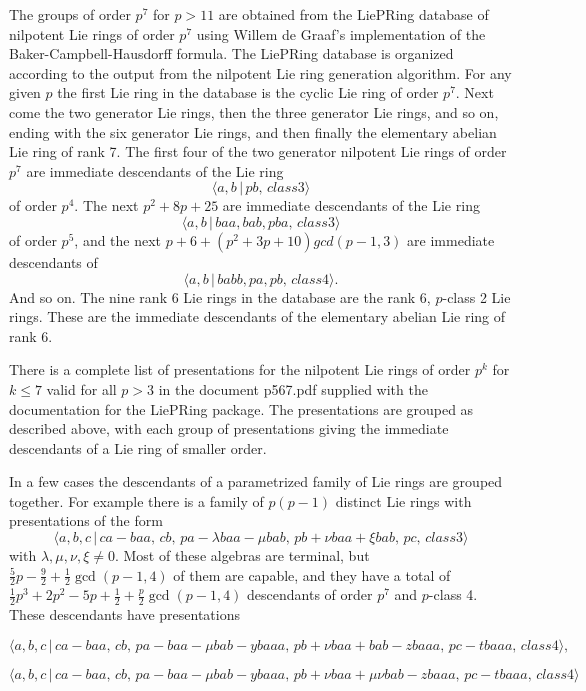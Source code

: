 The groups of order $p^{7}$ for $p>11$ are obtained from the LiePRing
database of nilpotent Lie rings of order $p^{7}$ using Willem de Graaf's
implementation of the Baker-Campbell-Hausdorff formula. The LiePRing
database is organized according to the output from the nilpotent Lie ring
generation algorithm. For any given $p$ the first Lie ring in the database
is the cyclic Lie ring of order $p^{7}$. Next come the two generator Lie
rings, then the three generator Lie rings, and so on, ending with the six
generator Lie rings, and then finally the elementary abelian Lie ring of
rank 7. The first four of the two generator nilpotent Lie rings of order 
$p^{7}$ are immediate descendants of the Lie ring
$$
\langle a,b\,|\,pb,\,class 3\rangle 
$$
of order $p^{4}$. The next $p^{2}+8p+25$ are immediate descendants of the
Lie ring
$$
\langle a,b\,|\,baa,bab,pba,\,class 3\rangle 
$$
of order $p^{5}$, and the next $p+6+(p^{2}+3p+10) gcd(p-1,3)$ are immediate
descendants of
$$
\langle a,b\,|\,babb,pa,pb,\,class 4\rangle . 
$$
And so on. The nine rank 6 Lie rings in the database are the rank 6, 
$p$-class 2 Lie rings. These are the immediate descendants of the elementary
abelian Lie ring of rank 6.

There is a complete list of presentations for the nilpotent Lie rings of
order $p^{k}$ for $k\leq 7$ valid for all $p>3$ in the document p567.pdf
supplied with the documentation for the LiePRing package. The presentations
are grouped as described above, with each group of presentations giving the
immediate descendants of a Lie ring of smaller order.

In a few cases the descendants of a parametrized family of Lie rings are
grouped together. For example there is a family of $p(p-1)$ distinct Lie
rings with presentations of the form
$$
\langle a,b,c\,|\,ca-baa,\,cb,\,pa-\lambda baa-\mu bab,\,pb+\nu baa+\xi
bab,\,pc,\,class 3\rangle 
$$
with $\lambda ,\mu ,\nu ,\xi \neq 0$. Most of these algebras are terminal,
but $\frac{5}{2}p-\frac{9}{2}+\frac{1}{2}\gcd (p-1,4)$ of them are capable,
and they have a total of $\frac{1}{2}p^{3}+2p^{2}-5p+\frac{1}{2}+\frac{p}{2}%
\gcd (p-1,4)$ descendants of order $p^{7}$ and $p$-class 4. These
descendants have presentations

$$
\langle a,b,c\,|\,ca-baa,\,cb,\,pa-baa-\mu bab-ybaaa,\,pb+\nu
baa+bab-zbaaa,\,pc-tbaaa,\,class 4\rangle , 
$$

$$
\langle a,b,c\,|\,ca-baa,\,cb,\,pa-baa-\mu bab-ybaaa,\,pb+\nu baa+\mu \nu
bab-zbaaa,\,pc-tbaaa,\,class 4\rangle 
$$

